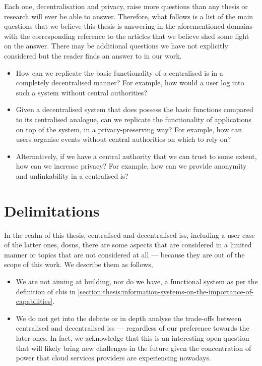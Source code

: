 Each one, decentralisation and privacy, raise more questions than any thesis or 
research will ever be able to answer. Therefore, what follows is a list of the main 
questions that we believe this thesis is answering in the aforementioned domains with 
the corresponding reference to the articles that we believe shed some light on the 
answer. There may be additional questions we have not explicitly considered but 
the reader finds an answer to in our work. 

\begin{itemize}
    \item How can we replicate the basic functionality of a centralised \ac{is} 
    in a completely decentralised manner? For example, how would a user log into 
    such a system without central authorities?\\
    \item Given a decentralised system that does possess the basic functions compared 
    to its centralised analogue, can we replicate the functionality of applications 
    on top of the system, in a privacy-preserving way? For example, how can users 
    organise events without central authorities on which to rely on?\\
    \item Alternatively, if we have a central authority that we can trust to some 
    extent, how can we increase privacy? For example, how can we provide anonymity 
    and unlinkability in a centralised \ac{is}?\\
\end{itemize}

\section{Delimitations}
    \label{section:delimitations}
In the realm of this thesis, centralised and decentralised \acp{is}, including a 
user case of the latter ones, \acp{dosn}, there are some aspects that are considered 
in a limited manner or topics that are not considered at all --- because they are 
out of the scope of this work. We describe them as follows,

\begin{itemize}
    \item We are not aiming at building, nor do we have, a functional system as per 
    the definition of \ac{cbis} in \cref{section:thesis:information-systems-on-the-importance-of-capabilities}.

    \item We do not get into the debate or in depth analyse the trade-offs between 
    centralised and decentralised \acp{is} --- regardless of our preference towards 
    the later ones. In fact, we acknowledge that this is an interesting open question 
    that will likely bring new challenges in the future given the concentration 
    of power that cloud services providers are experiencing nowadays.
\end{itemize}

